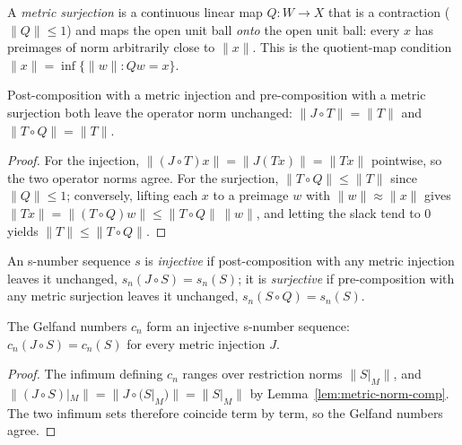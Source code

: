 \begin{definition}
\label{def:metric-surjection}
\leanok
A \emph{metric surjection} is a continuous linear map $Q : W \to X$ that is a
contraction ($\|Q\| \le 1$) and maps the open unit ball \emph{onto} the open
unit ball: every $x$ has preimages of norm arbitrarily close to $\|x\|$. This
is the quotient-map condition $\|x\| = \inf\{\|w\| : Q w = x\}$.
\end{definition}

\begin{lemma}
\label{lem:metric-norm-comp}
\leanok
{}
Post-composition with a metric injection and pre-composition with a metric
surjection both leave the operator norm unchanged:
$\|J \circ T\| = \|T\|$ and $\|T \circ Q\| = \|T\|$.
\end{lemma}
\begin{proof}
\leanok
For the injection, $\|(J \circ T)x\| = \|J(Tx)\| = \|Tx\|$ pointwise, so the
two operator norms agree. For the surjection, $\|T \circ Q\| \le \|T\|$ since
$\|Q\| \le 1$; conversely, lifting each $x$ to a preimage $w$ with
$\|w\| \approx \|x\|$ gives $\|Tx\| = \|(T\circ Q)w\| \le \|T\circ Q\|\,\|w\|$,
and letting the slack tend to $0$ yields $\|T\| \le \|T \circ Q\|$.
\end{proof}

\begin{definition}
\label{def:injective-surjective}
\leanok
{}
An s-number sequence $s$ is \emph{injective} if post-composition with any
metric injection leaves it unchanged, $s_n(J \circ S) = s_n(S)$; it is
\emph{surjective} if pre-composition with any metric surjection leaves it
unchanged, $s_n(S \circ Q) = s_n(S)$.
\end{definition}

\begin{theorem}
\label{thm:gelfand-injective}
\leanok
{}
The Gelfand numbers $c_n$ form an injective s-number sequence:
$c_n(J \circ S) = c_n(S)$ for every metric injection $J$.
\end{theorem}
\begin{proof}
\leanok
{}
The infimum defining $c_n$ ranges over restriction norms $\|S|_M\|$, and
$\|(J \circ S)|_M\| = \|J \circ (S|_M)\| = \|S|_M\|$ by
Lemma~\ref{lem:metric-norm-comp}. The two infimum sets therefore coincide
term by term, so the Gelfand numbers agree.
\end{proof}

